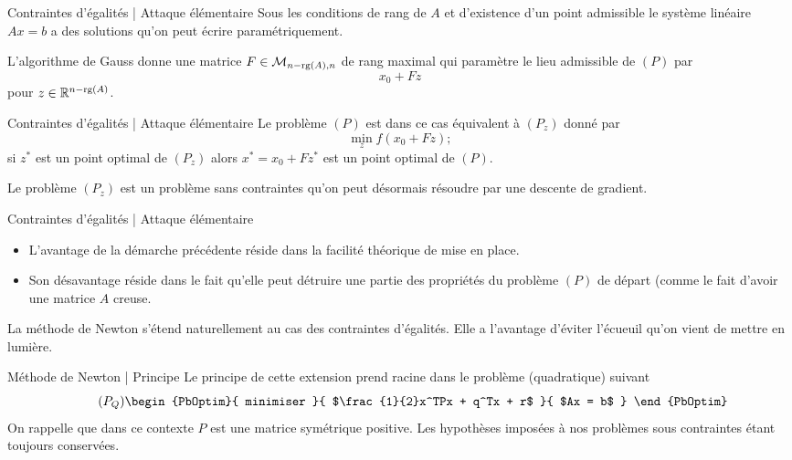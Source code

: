 \documentclass[aspectratio = 169]{beamer}
\begin{document}
\begin{frame}{Contraintes d'égalités | Attaque élémentaire}
  Sous les conditions de rang de $A$ et d'existence d'un point
  admissible le système linéaire $Ax = b$ a des solutions qu'on peut
  écrire paramétriquement.
  \pause

  L'algorithme de Gauss donne une matrice
  $F \in \mathcal{M}_{n - \operatorname{rg}(A), n}$ de rang maximal qui paramètre le lieu
  admissible de $(P)$ par
  \[
    x_0 + Fz
  \]
  pour $z \in \mathbb{R}^{n - \operatorname{rg}(A)}$.
\end{frame}

\begin{frame}{Contraintes d'égalités | Attaque élémentaire}
  Le problème $(P)$ est dans ce cas équivalent à $(P_z)$ donné par
  \begin{equation}
    \label{Pz}
    \tag{$P_z$}
      \min_{z} f(x_0 + Fz) ;
  \end{equation}
  si $z^*$ est un point optimal de $(P_z)$ alors $x^* = x_0 + Fz^*$
  est un point optimal de $(P)$. \pause

  Le problème $(P_z)$ est un problème sans contraintes qu'on peut
  désormais résoudre par une descente de gradient.
\end{frame}

\begin{frame}{Contraintes d'égalités | Attaque élémentaire}
  \begin{itemize}
  \item<1-> L'avantage de la démarche précédente réside dans la
    facilité théorique de mise en place.
  \item<2-> Son désavantage réside dans le fait qu'elle peut détruire
    une partie des propriétés du problème $(P)$ de départ (comme le
    fait d'avoir une matrice $A$ creuse.
  \end{itemize}
  \pause[3]

  La méthode de Newton s'étend naturellement au cas des contraintes
  d'égalités. Elle a l'avantage d'éviter l'écueuil qu'on vient de
  mettre en lumière.
\end{frame}

\begin{frame}{Méthode de Newton | Principe}
  Le principe de cette extension prend racine dans le problème
  (quadratique) suivant
  \begin{equation}
    \label{PQ}
    \tag{$P_Q$}
    \begin{PbOptim}{
        minimiser
      }{
        $\frac{1}{2}x^TPx + q^Tx + r$
      }{
        $Ax = b$
      }
    \end{PbOptim}
  \end{equation}
  On rappelle que dans ce contexte $P$ est une matrice symétrique
  positive. Les hypothèses imposées à nos problèmes sous contraintes
  étant toujours conservées.
\end{frame}
\end{document}
